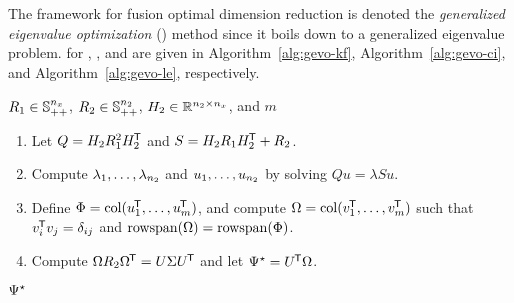 The framework for fusion optimal dimension reduction is denoted the \emph{generalized eigenvalue optimization} (\abbrGEVO) method since it boils down to a generalized eigenvalue problem. \abbrGEVO for \abbrKF, \abbrCI, and \abbrLE are given in Algorithm~\ref{alg:gevo-kf}, Algorithm~\ref{alg:gevo-ci}, and Algorithm~\ref{alg:gevo-le}, respectively. 


\begin{algorithm}[t]
	\caption{\GEVOKF} 
	\label{alg:gevo-kf}
	\begin{small}
	\begin{algorithmic}[0]
		\Input $R_1\in\mathbb{S}_{++}^{n_x}$, $R_2\in\mathbb{S}_{++}^{n_2}$, $H_2\in\mathbb{R}^{n_2\times n_x}$, and $m$ 
		\begin{enumerate}
			\item Let $Q = H_2R_1^2H_2^{\mkern-1.5mu\mathsf{T}}$ and $S = H_2R_1H_2^{\mkern-1.5mu\mathsf{T}}+R_2$. 
			\item Compute $\lambda_1,\dots,\lambda_{n_2}$ and $u_1,\dots,u_{n_2}$ by solving $Qu = \lambda Su$.
			\item Define $\Phi=\operatorname*{\rm col}(u_1^{\mkern-1.5mu\mathsf{T}},\dots,u_m^{\mkern-1.5mu\mathsf{T}})$, and compute $\Omega=\operatorname*{\rm col}(v_1^{\mkern-1.5mu\mathsf{T}},\dots,v_m^{\mkern-1.5mu\mathsf{T}})$ such that $v_i^{\mkern-1.5mu\mathsf{T}} v_j=\delta_{ij}$ and $\operatorname*{\rm rowspan}(\Omega)=\operatorname*{\rm rowspan}(\Phi)$.
			\item Compute $\Omega R_2\Omega^{\mkern-1.5mu\mathsf{T}} = U\Sigma U^{\mkern-1.5mu\mathsf{T}}$ and let $\Psi^\star=U^{\mkern-1.5mu\mathsf{T}}\Omega$.
		\end{enumerate}
		\Output $\Psi^\star$
	\end{algorithmic}
	\end{small}
\end{algorithm}


